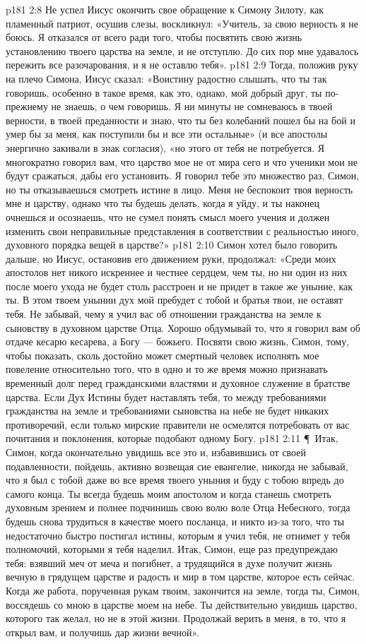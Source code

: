 \vs p181 2:8 Не успел Иисус окончить свое обращение к Симону Зилоту, как пламенный патриот, осушив слезы, воскликнул: «Учитель, за свою верность я не боюсь. Я отказался от всего ради того, чтобы посвятить свою жизнь установлению твоего царства на земле, и не отступлю. До сих пор мне удавалось пережить все разочарования, и я не оставлю тебя».
\vs p181 2:9 Тогда, положив руку на плечо Симона, Иисус сказал: «Воистину радостно слышать, что ты так говоришь, особенно в такое время, как это, однако, мой добрый друг, ты по\hyp{}прежнему не знаешь, о чем говоришь. Я ни минуты не сомневаюсь в твоей верности, в твоей преданности и знаю, что ты без колебаний пошел бы на бой и умер бы за меня, как поступили бы и все эти остальные» (и все апостолы энергично закивали в знак согласия), «но этого от тебя не потребуется. Я многократно говорил вам, что царство мое не от мира сего и что ученики мои не будут сражаться, дабы его установить. Я говорил тебе это множество раз, Симон, но ты отказываешься смотреть истине в лицо. Меня не беспокоит твоя верность мне и царству, однако что ты будешь делать, когда я уйду, и ты наконец очнешься и осознаешь, что не сумел понять смысл моего учения и должен изменить свои неправильные представления в соответствии с реальностью иного, духовного порядка вещей в царстве?»
\vs p181 2:10 Симон хотел было говорить дальше, но Иисус, остановив его движением руки, продолжал: «Среди моих апостолов нет никого искреннее и честнее сердцем, чем ты, но ни один из них после моего ухода не будет столь расстроен и не придет в такое же уныние, как ты. В этом твоем унынии дух мой пребудет с тобой и братья твои, не оставят тебя. Не забывай, чему я учил вас об отношении гражданства на земле к сыновству в духовном царстве Отца. Хорошо обдумывай то, что я говорил вам об отдаче кесарю кесарева, а Богу --- божьего. Посвяти свою жизнь, Симон, тому, чтобы показать, сколь достойно может смертный человек исполнять мое повеление относительно того, что в одно и то же время можно признавать временный долг перед гражданскими властями и духовное служение в братстве царства. Если Дух Истины будет наставлять тебя, то между требованиями гражданства на земле и требованиями сыновства на небе не будет никаких противоречий, если только мирские правители не осмелятся потребовать от вас почитания и поклонения, которые подобают одному Богу.
\vs p181 2:11 \P\ Итак, Симон, когда окончательно увидишь все это и, избавившись от своей подавленности, пойдешь, активно возвещая сие евангелие, никогда не забывай, что я был с тобой даже во все время твоего уныния и буду с тобою впредь до самого конца. Ты всегда будешь моим апостолом и когда станешь смотреть духовным зрением и полнее подчинишь свою волю воле Отца Небесного, тогда будешь снова трудиться в качестве моего посланца, и никто из\hyp{}за того, что ты недостаточно быстро постигал истины, которым я учил тебя, не отнимет у тебя полномочий, которыми я тебя наделил. Итак, Симон, еще раз предупреждаю тебя: взявший меч от меча и погибнет, а трудящийся в духе получит жизнь вечную в грядущем царстве и радость и мир в том царстве, которое есть сейчас. Когда же работа, порученная рукам твоим, закончится на земле, тогда ты, Симон, воссядешь со мною в царстве моем на небе. Ты действительно увидишь царство, которого так желал, но не в этой жизни. Продолжай верить в меня, в то, что я открыл вам, и получишь дар жизни вечной».
